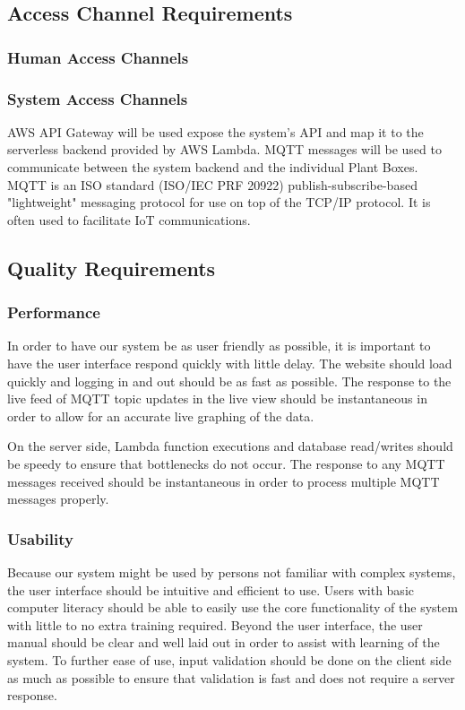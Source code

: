 \documentclass{article}
\begin{document}
\subsection{Access Channel Requirements}

\subsubsection{Human Access Channels}

\subsubsection{System Access Channels}
AWS API Gateway will be used expose the system's API and map it to the serverless backend provided by AWS Lambda. MQTT messages will be used to communicate between the system backend and the individual Plant Boxes. MQTT is an ISO standard (ISO/IEC PRF 20922) publish-subscribe-based "lightweight" messaging protocol for use on top of the TCP/IP protocol. It is often used to facilitate IoT communications.

	\subsection{Quality Requirements}
		\subsubsection{Performance}
			In order to have our system be as user friendly as possible, it is important to have the user interface respond quickly with little delay. The website should load quickly and logging in and out should be as fast as possible. The response to the live feed of MQTT topic updates in the live view should be instantaneous in order to allow for an accurate live graphing of the data.
				
			On the server side, Lambda function executions and database read/writes should be speedy to ensure that bottlenecks do not occur. The response to any MQTT messages received should be instantaneous in order to process multiple MQTT messages properly.
			
		\subsubsection{Usability}
			Because our system might be used by persons not familiar with complex systems, the user interface should be intuitive and efficient to use. Users with basic computer literacy should be able to easily use the core functionality of the system with little to no extra training required. Beyond the user interface, the user manual should be clear and well laid out in order to assist with learning of the system. To further ease of use, input validation should be done on the client side as much as possible to ensure that validation is fast and does not require a server response.
			
\end{document}
